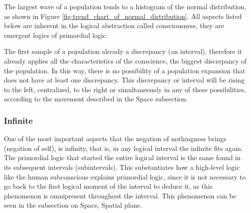 The largest wave of a population tends to a histogram of the normal distribution, as shown in Figure \ref{fig:trend_chart_of_normal_distribution}. All aspects listed below are inherent in the logical abstraction called consciousness, they are emergent logics of primordial logic.

The first sample of a population already a discrepancy (an interval), therefore it already applies all the characteristics of the conscience, the biggest discrepancy of the population. In this way, there is no possibility of a population expansion that does not have at least one discrepancy. This discrepancy or interval will be rising to the left, centralized, to the right or simultaneously in any of these possibilities, according to the movement described in the Space subsection.

\subsubsection{Infinite}
One of the most important aspects that the negation of nothingness brings (negation of self), is infinity, that is, in any logical interval the infinite fits again. The primordial logic that started the entire logical interval is the same found in its subsequent intervals (subintervals). This substantiates how a high-level logic like the human subconscious explains primordial logic, since it is not necessary to go back to the first logical moment of the interval to deduce it, as this phenomenon is omnipresent throughout the interval. This phenomenon can be seen in the subsection on Space, Spatial plane.


